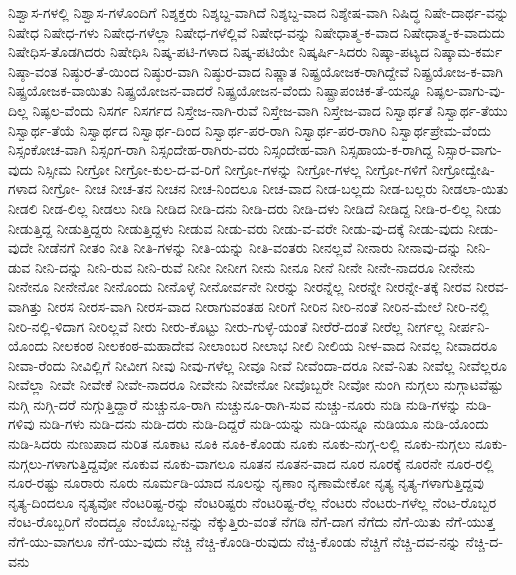 {ನಿಶ್ವಾಸ-ಗಳಲ್ಲಿ
ನಿಶ್ವಾಸ-ಗಳೊಂದಿಗೆ
ನಿಶ್ಶಕ್ತರು
ನಿಶ್ಶಬ್ದ-ವಾಗಿದೆ
ನಿಶ್ಶಬ್ದ-ವಾದ
ನಿಶ್ಶೇಷ-ವಾಗಿ
ನಿಷಿದ್ಧ
ನಿಷೇ-ದಾರ್ಥ-ವನ್ನು
ನಿಷೇಧ
ನಿಷೇಧ-ಗಳು
ನಿಷೇಧ-ಗಳೆಲ್ಲಾ
ನಿಷೇಧ-ಗಳೆಲ್ಲಿವೆ
ನಿಷೇಧ-ವನ್ನು
ನಿಷೇಧಾತ್ಮ-ಕ-ವಾದ
ನಿಷೇಧಾತ್ಮ-ಕ-ವಾದುದು
ನಿಷೇಧಿಸ-ತೊಡಗಿದರು
ನಿಷೇಧಿಸಿ
ನಿಷ್ಕ-ಪಟಿ-ಗಳಾದ
ನಿಷ್ಕ-ಪಟಿಯೇ
ನಿಷ್ಕರ್ಷಿ-ಸಿದರು
ನಿಷ್ಕಾ-ಪಟ್ಯದ
ನಿಷ್ಕಾಮ-ಕರ್ಮ
ನಿಷ್ಠಾ-ವಂತ
ನಿಷ್ಠುರ-ತೆ-ಯಿಂದ
ನಿಷ್ಠುರ-ವಾಗಿ
ನಿಷ್ಠುರ-ವಾದ
ನಿಷ್ಣಾತ
ನಿಷ್ಪ್ರಯೋಜಕ-ರಾಗಿದ್ದೇವೆ
ನಿಷ್ಪ್ರಯೋಜ-ಕ-ವಾಗಿ
ನಿಷ್ಪ್ರಯೋಜಕ-ವಾಯಿತು
ನಿಷ್ಪ್ರಯೋಜನ-ವಾದರೆ
ನಿಷ್ಪ್ರಯೋಜನ-ವೆಂದು
ನಿಷ್ಪ್ರಾಪಂಚಿಕ-ತೆ-ಯನ್ನೂ
ನಿಷ್ಫಲ-ವಾಗು-ವು-ದಿಲ್ಲ
ನಿಷ್ಫಲ-ವೆಂದು
ನಿಸರ್ಗ
ನಿಸರ್ಗದ
ನಿಸ್ತೇಜ-ನಾಗಿ-ರುವೆ
ನಿಸ್ತೇಜ-ವಾಗಿ
ನಿಸ್ತೇಜ-ವಾದ
ನಿಸ್ವಾರ್ಥತೆ
ನಿಸ್ವಾರ್ಥ-ತೆಯು
ನಿಸ್ವಾರ್ಥ-ತೆಯೆ
ನಿಸ್ವಾರ್ಥದ
ನಿಸ್ವಾರ್ಥ-ದಿಂದ
ನಿಸ್ವಾರ್ಥ-ಪರ-ರಾಗಿ
ನಿಸ್ವಾರ್ಥ-ಪರ-ರಾಗಿರಿ
ನಿಸ್ವಾರ್ಥಪ್ರೇಮ-ವೆಂದು
ನಿಸ್ಸಂಕೋಚ-ವಾಗಿ
ನಿಸ್ಸಂಗ-ರಾಗಿ
ನಿಸ್ಸಂದೇಹ-ರಾಗಿರು-ವರು
ನಿಸ್ಸಂದೇಹ-ವಾಗಿ
ನಿಸ್ಸಹಾಯ-ಕ-ರಾಗಿದ್ದ
ನಿಸ್ಸಾರ-ವಾಗು-ವುದು
ನಿಸ್ಸೀಮ
ನೀಗ್ರೋ
ನೀಗ್ರೋ-ಕುಲ-ದ-ವ-ರಿಗೆ
ನೀಗ್ರೋ-ಗಳನ್ನು
ನೀಗ್ರೋ-ಗಳಲ್ಲ
ನೀಗ್ರೋ-ಗಳಿಗೆ
ನೀಗ್ರೋದ್ವೇಷಿ-ಗಳಾದ
ನೀಗ್ರೋ-
ನೀಚ
ನೀಚ-ತನ
ನೀಚನ
ನೀಚ-ನಿಂದಲೂ
ನೀಚ-ವಾದ
ನೀಡ-ಬಲ್ಲದು
ನೀಡ-ಬಲ್ಲರು
ನೀಡಲಾ-ಯಿತು
ನೀಡಲಿ
ನೀಡ-ಲಿಲ್ಲ
ನೀಡಲು
ನೀಡಿ
ನೀಡಿದ
ನೀಡಿ-ದನು
ನೀಡಿ-ದರು
ನೀಡಿ-ದಳು
ನೀಡಿದೆ
ನೀಡಿದ್ದ
ನೀಡಿ-ರ-ಲಿಲ್ಲ
ನೀಡು
ನೀಡುತ್ತಿದ್ದ
ನೀಡುತ್ತಿದ್ದರು
ನೀಡುತ್ತಿದ್ದಳು
ನೀಡುವ
ನೀಡು-ವರು
ನೀಡು-ವ-ವರೇ
ನೀಡು-ವು-ದಕ್ಕೆ
ನೀಡು-ವುದು
ನೀಡು-ವುದೇ
ನೀಡೆನಗೆ
ನೀತಂ
ನೀತಿ
ನೀತಿ-ಗಳನ್ನು
ನೀತಿ-ಯನ್ನು
ನೀತಿ-ವಂತರು
ನೀನಲ್ಲವೆ
ನೀನಾರು
ನೀನಾವು-ದನ್ನು
ನೀನಿ-ಡುವ
ನೀನಿ-ದನ್ನು
ನೀನಿ-ರುವ
ನೀನಿ-ರುವೆ
ನೀನೀ
ನೀನೀಗ
ನೀನು
ನೀನೂ
ನೀನೆ
ನೀನೇ
ನೀನೇ-ನಾದರೂ
ನೀನೇನು
ನೀನೇನೂ
ನೀನೇನೋ
ನೀನೊಂದು
ನೀನೊಳ್ಳೆ
ನೀನೋರ್ವನೇ
ನೀರನ್ನು
ನೀರನ್ನೆಲ್ಲ
ನೀರನ್ನೇ
ನೀರನ್ನೇ-ತಕ್ಕೆ
ನೀರವ
ನೀರವ-ವಾಗಿತ್ತು
ನೀರಸ
ನೀರಸ-ವಾಗಿ
ನೀರಸ-ವಾದ
ನೀರಾಗುವಂತಹ
ನೀರಿಗೆ
ನೀರಿನ
ನೀರಿ-ನಂತೆ
ನೀರಿನ-ಮೇಲೆ
ನೀರಿ-ನಲ್ಲಿ
ನೀರಿ-ನಲ್ಲಿ-ಳಿದಾಗ
ನೀರಿಲ್ಲವೆ
ನೀರು
ನೀರು-ಕೊಟ್ಟು
ನೀರು-ಗುಳ್ಳೆ-ಯಂತೆ
ನೀರೆರೆ-ದಂತೆ
ನೀರೆಲ್ಲ
ನೀರ್ಗಲ್ಲ
ನೀರ್ಪನಿ-ಯೊಂದು
ನೀಲಕಂಠ
ನೀಲಕಂಠ-ಮಹಾದೇವ
ನೀಲಾಂಬರ
ನೀಲಾಭ
ನೀಲಿ
ನೀಲಿಯ
ನೀಳ-ವಾದ
ನೀವಲ್ಲ
ನೀವಾದರೂ
ನೀವಾ-ರೆಂದು
ನೀವಿಲ್ಲಿಗೆ
ನೀವೀಗ
ನೀವು
ನೀವು-ಗಳೆಲ್ಲ
ನೀವೂ
ನೀವೆ
ನೀವೆಂದಾ-ದರೂ
ನೀವೆ-ನಿತು
ನೀವೆಲ್ಲ
ನೀವೆಲ್ಲರೂ
ನೀವೆಲ್ಲಾ
ನೀವೇ
ನೀವೇಕೆ
ನೀವೇ-ನಾದರೂ
ನೀವೇನು
ನೀವೇನೋ
ನೀವೊಬ್ಬರೇ
ನೀವೋ
ನುಂಗಿ
ನುಗ್ಗಲು
ನುಗ್ಗಾಟವೆಷ್ಟು
ನುಗ್ಗಿ
ನುಗ್ಗಿ-ದರೆ
ನುಗ್ಗುತ್ತಿದ್ದಾರೆ
ನುಚ್ಚುನೂ-ರಾಗಿ
ನುಚ್ಚುನೂ-ರಾಗಿ-ಸುವ
ನುಚ್ಚು-ನೂರು
ನುಡಿ
ನುಡಿ-ಗಳನ್ನು
ನುಡಿ-ಗಳಿವು
ನುಡಿ-ಗಳು
ನುಡಿ-ದನು
ನುಡಿ-ದರು
ನುಡಿ-ದಿದ್ದರೆ
ನುಡಿ-ಯನ್ನು
ನುಡಿ-ಯನ್ನೂ
ನುಡಿಯೂ
ನುಡಿ-ಯೊಂದು
ನುಡಿ-ಸಿದರು
ನುಣುಪಾದ
ನುರಿತ
ನೂಕಾಟ
ನೂಕಿ
ನೂಕಿ-ಕೊಂಡು
ನೂಕು
ನೂಕು-ನುಗ್ಗ-ಲಲ್ಲಿ
ನೂಕು-ನುಗ್ಗಲು
ನೂಕು-ನುಗ್ಗಲು-ಗಳಾಗುತ್ತಿದ್ದವೋ
ನೂಕುವ
ನೂಕು-ವಾಗಲೂ
ನೂತನ
ನೂತನ-ವಾದ
ನೂರ
ನೂರಕ್ಕೆ
ನೂರನೇ
ನೂರ-ರಲ್ಲಿ
ನೂರ-ರಷ್ಟು
ನೂರಾರು
ನೂರು
ನೂರ್ಮಡಿ-ಯಾದ
ನೂಲನ್ನು
ನೃಣಾಂ
ನೃಣಾಮೇಕೋ
ನೃತ್ಯ
ನೃತ್ಯ-ಗಳಾಗುತ್ತಿದ್ದವು
ನೃತ್ಯ-ದಿಂದಲೂ
ನೃತ್ಯವೋ
ನೆಂಟರಿಷ್ಟ-ರನ್ನು
ನೆಂಟರಿಷ್ಟರು
ನೆಂಟರಿಷ್ಟ-ರೆಲ್ಲ
ನೆಂಟರು
ನೆಂಟರು-ಗಳೆಲ್ಲ
ನೆಂಟ-ರೊಬ್ಬರ
ನೆಂಟ-ರೊಬ್ಬರಿಗೆ
ನೆಂದದ್ದೂ
ನೆಂಬೊಬ್ಬ-ನನ್ನು
ನೆಕ್ಕುತ್ತಿರು-ವಂತೆ
ನೆಗಡಿ
ನೆಗೆ-ದಾಗ
ನೆಗೆದು
ನೆಗೆ-ಯಿತು
ನೆಗೆ-ಯುತ್ತ
ನೆಗೆ-ಯು-ವಾಗಲೂ
ನೆಗೆ-ಯು-ವುದು
ನೆಚ್ಚಿ
ನೆಚ್ಚಿ-ಕೊಂಡಿ-ರುವುದು
ನೆಚ್ಚಿ-ಕೊಂಡು
ನೆಚ್ಚಿಗೆ
ನೆಚ್ಚಿ-ದವ-ನನ್ನು
ನೆಚ್ಚಿ-ದ-ವನು
}
